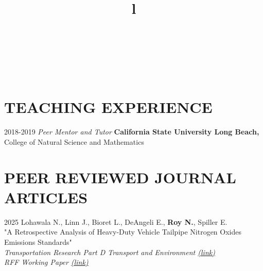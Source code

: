 \documentclass[margin]{res}
\begin{document}
\begin{resume}
\begin{format}
\title{l}\\
\\
\body\\
\end{format}

\section{TEACHING EXPERIENCE}
2018-2019 \hspace{2mm} \textit{Peer Mentor and Tutor} \hfill{\textbf{California State University Long Beach,}} \\
\hspace*{1mm} \hfill{College of Natural Science and Mathematics} 

\section{PEER REVIEWED JOURNAL ARTICLES}

2025 \hspace{4mm}%
Lohawala N., Linn J., Bioret L., DeAngeli E., \textbf{Roy N.}, Spiller E. \\
\hspace*{16mm} "A Retrospective Analysis of Heavy-Duty Vehicle Tailpipe Nitrogen Oxides \\ 
\hspace*{16mm} Emissions Standards" \\
\hspace*{16mm} \textit{Transportation Research Part D Transport and Environment 
\href{https://www.sciencedirect.com/science/article/abs/pii/S1361920925004754} {(link)}} \\
\hspace*{16mm} \textit{RFF Working Paper \href{https://www.rff.org/publications/working-papers/a-retrospective-analysis-of-heavy-duty-vehicle-tailpipe-nitrogen-oxides-emissions-standards/}{(link)}}


\end{resume}
\end{document}
